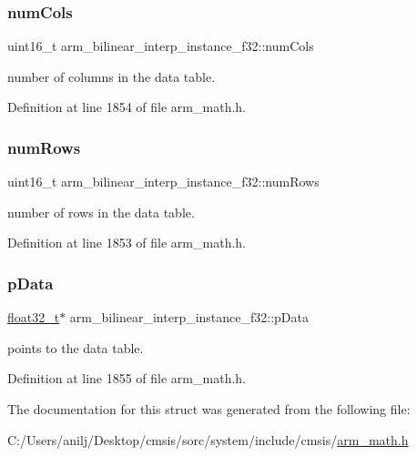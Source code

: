 \subsubsection{\texorpdfstring{num\+Cols}{numCols}}
{\footnotesize\ttfamily uint16\+\_\+t arm\+\_\+bilinear\+\_\+interp\+\_\+instance\+\_\+f32\+::num\+Cols}

number of columns in the data table. 

Definition at line 1854 of file arm\+\_\+math.\+h.

\mbox{\label{structarm__bilinear__interp__instance__f32_a34f2b17cc57b95011960df9718af6ed6}} 
\subsubsection{\texorpdfstring{num\+Rows}{numRows}}
{\footnotesize\ttfamily uint16\+\_\+t arm\+\_\+bilinear\+\_\+interp\+\_\+instance\+\_\+f32\+::num\+Rows}

number of rows in the data table. 

Definition at line 1853 of file arm\+\_\+math.\+h.

\mbox{\label{structarm__bilinear__interp__instance__f32_afd1e764591c991c212d56c893efb5ea4}} 
\subsubsection{\texorpdfstring{p\+Data}{pData}}
{\footnotesize\ttfamily \hyperlink{arm__math_8h_a4611b605e45ab401f02cab15c5e38715}{float32\+\_\+t}$\ast$ arm\+\_\+bilinear\+\_\+interp\+\_\+instance\+\_\+f32\+::p\+Data}

points to the data table. 

Definition at line 1855 of file arm\+\_\+math.\+h.



The documentation for this struct was generated from the following file\+:\begin{DoxyCompactItemize}
\item 
C\+:/\+Users/anilj/\+Desktop/cmsis/sorc/system/include/cmsis/\hyperlink{arm__math_8h}{arm\+\_\+math.\+h}\end{DoxyCompactItemize}
